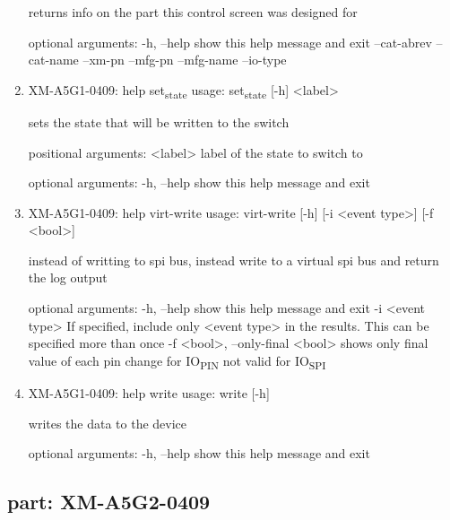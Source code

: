 \documentclass[11pt]{article}
\begin{document}
\begin{enumerate}
returns info on the part this control screen was designed for

optional arguments:
  -h, --help   show this help message and exit
  --cat-abrev
  --cat-name
  --xm-pn
  --mfg-pn
  --mfg-name
  --io-type

\item XM-A5G1-0409: help set\textsubscript{state}
\label{sec:org8ee201f}
usage: set\textsubscript{state} [-h] <label>

sets the state that will be written to the switch

positional arguments:
  <label>     label of the state to switch to

optional arguments:
  -h, --help  show this help message and exit

\item XM-A5G1-0409: help virt-write
\label{sec:org14cdf22}
usage: virt-write [-h] [-i <event type>] [-f <bool>]

instead of writting to spi bus, instead write to a virtual spi bus and return
the log output

optional arguments:
  -h, --help            show this help message and exit
  -i <event type>       If specified, include only <event type> in the
                        results. This can be specified more than once
  -f <bool>, --only-final <bool>
                        shows only final value of each pin change for IO\textsubscript{PIN}
                        not valid for IO\textsubscript{SPI}

\item XM-A5G1-0409: help write
\label{sec:org8714d56}
usage: write [-h]

writes the data to the device

optional arguments:
  -h, --help  show this help message and exit
\end{enumerate}

\subsection{part: XM-A5G2-0409}
\label{sec:orgbd9450e}
\end{document}
